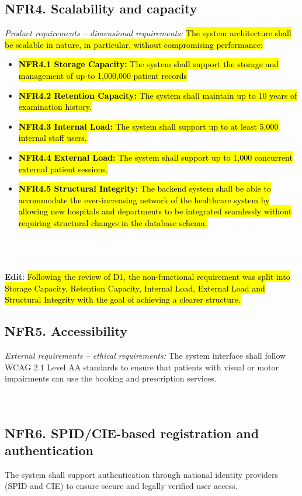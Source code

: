 \documentclass[12pt, a4paper]{article}
\begin{document}
\subsection{NFR4. Scalability and capacity} \label{NFR4}
\textit{Product requirements -- dimensional requirements:}
\hl{The system architecture shall be scalable in nature, in particular, without compromising performance:}
\begin{itemize}
    \item \hl{\textbf{NFR4.1 Storage Capacity:} The system shall support the storage and management of up to 1,000,000 patient records}
    \item \hl{\textbf{NFR4.2 Retention Capacity:} The system shall maintain up to 10 years of examination history.}
    \item \hl{\textbf{NFR4.3 Internal Load:} The system shall support up to at least 5,000 internal staff users.}
    \item \hl{\textbf{NFR4.4 External Load:} The system shall support up to 1,000 concurrent external patient sessions.}
    \item \hl{\textbf{NFR4.5 Structural Integrity:} The backend system shall be able to accommodate the ever-increasing network of the healthcare system by allowing new hospitals and departments to be integrated seamlessly without requiring structural changes in the database schema.}
\end{itemize}
\\ 
\\ 
\\ \textbf{Edit}:
\hl{Following the review of D1, the non-functional requirement was split into Storage Capacity, Retention Capacity, Internal Load, External Load and Structural Integrity with the goal of achieving a clearer structure.}


\subsection{NFR5. Accessibility} \label{NFR5}
    \textit{External requirements -- ethical requirements:}
    The system interface shall follow WCAG 2.1 Level AA standards to ensure that patients with visual or motor impairments can use the booking and prescription services.
    \\ 
    \\ 
    \\ 
    
\subsection{NFR6. SPID/CIE-based registration and authentication} \label{NFR6}
The system shall support authentication through national identity providers (SPID and CIE) to ensure secure and legally verified user access.
\\ 
\\ 
\\ 
\end{document}
